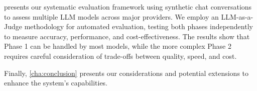  presents our systematic evaluation framework using synthetic chat conversations to assess multiple LLM models across major providers.
We employ an LLM-as-a-Judge methodology for automated evaluation, testing both phases independently to measure accuracy, performance, and cost-effectiveness.
The results show that Phase 1 can be handled by most models, while the more complex Phase 2 requires careful consideration of trade-offs between quality, speed, and cost.


Finally, \cref{cha:conclusion} presents our considerations and potential extensions to enhance the system's capabilities.
